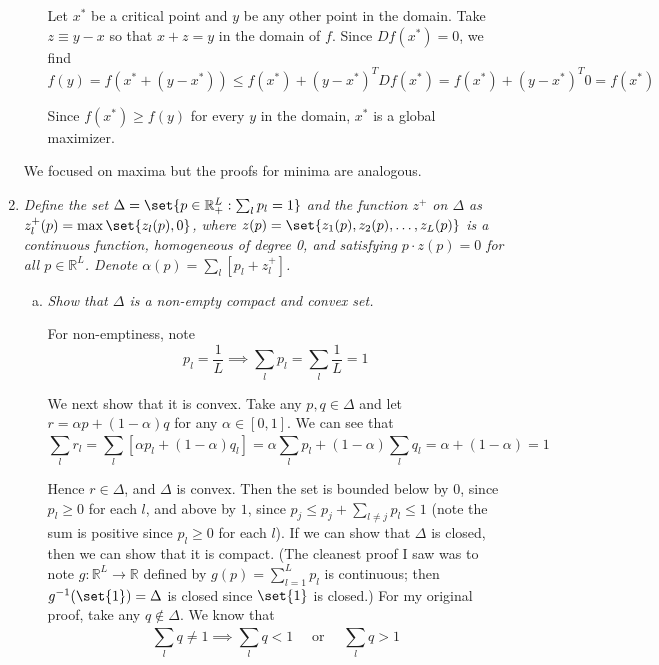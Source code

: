 \documentclass{article}
\begin{document}
\begin{enumerate}[1.]
\begin{enumerate}[a)]
        Let $x^*$ be a critical point and $y$ be any other point in the domain. Take $z \equiv y - x$ so that $x + z = y$ in the domain of $f$. Since $D f(x^*) = 0$, we find
        \[
          f(y)
          =
          f(x^* + (y - x^*))
          \le f(x^*) + (y - x^*)^T D f(x^*)
          = f(x^*) + (y - x^*)^T 0
          = f(x^*)
        \]

        Since $f(x^*) \ge f(y)$ for every $y$ in the domain, $x^*$ is a global maximizer.
    \end{enumerate}

    \begin{remark}
      We focused on maxima but the proofs for minima are analogous.
    \end{remark}

  \item {\itshape
    Define the set $\Delta = \set{p \in \mathbb{R}^L_{+}: \sum^{}_{l} p_l = 1}$ and the function $z^+$ on $\Delta$ as $z^+_l(p) = \max\set{z_l(p), 0}$, where $z(p) = \set{z_1(p), z_2(p), \ldots, z_L(p)}$ is a continuous function, homogeneous of degree 0, and satisfying $p \cdot z(p) = 0$ for all $p \in \mathbb{R}^L$. Denote $\alpha(p) = \sum^{}_{l} \left[p_l + z_l^+\right]$.}

    \begin{enumerate}[a)]
      \item \textit{Show that $\Delta$ is a non-empty compact and convex set.}

        \solution For non-emptiness, note
        \[
          p_l = \dfrac{1}{L}
          \implies
          \sum_l p_l = \sum^{}_{l} \dfrac{1}{L} = 1
        \]

        We next show that it is convex. Take any $p, q \in \Delta$ and let $r = \alpha p + (1 - \alpha) q$ for any $\alpha \in [0, 1]$. We can see that
        \[
          \sum^{}_{l} r_l
          = \sum^{}_{l} \left[\alpha p_l + (1 - \alpha) q_l\right]
          = \alpha \sum^{}_{l} p_l + (1 - \alpha) \sum^{}_{l} q_l
          = \alpha + (1 - \alpha)
          = 1
        \]

        Hence $r \in \Delta$, and $\Delta$ is convex. Then the set is bounded below by $0$, since $p_l \ge 0$ for each $l$, and above by $1$, since $p_j \le p_j + \sum^{}_{l \ne j} p_l \le 1$ (note the sum is positive since $p_l \ge 0$ for each $l$). If we can show that $\Delta$ is closed, then we can show that it is compact. (The cleanest proof I saw was to note $g: \mathbb{R}^L \to \mathbb{R}$ defined by $g(p) = \sum^{L}_{l = 1} p_l$ is continuous; then $g^{-1}(\set{1}) = \Delta$ is closed since $\set{1}$ is closed.) For my original proof, take any $q \notin \Delta$. We know that
        \[
          \sum^{}_{l} q \ne 1
          \implies
          \sum^{}_{l} q < 1
          \quad
          \text{ or }
          \quad
          \sum^{}_{l} q > 1
        \]


\end{enumerate}
\end{enumerate}
\end{document}
